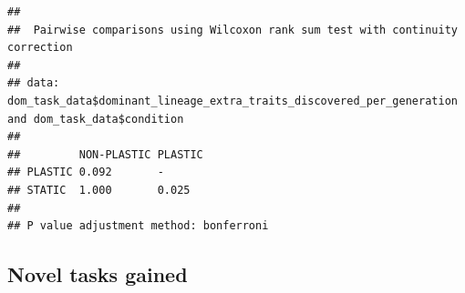 \documentclass[]{book}
\newenvironment{Shaded}{\begin{snugshade}}{\end{snugshade}}
\newcommand{\DataTypeTok}[1]{\textcolor[rgb]{0.13,0.29,0.53}{#1}}
\newcommand{\FloatTok}[1]{\textcolor[rgb]{0.00,0.00,0.81}{#1}}
\newcommand{\KeywordTok}[1]{\textcolor[rgb]{0.13,0.29,0.53}{\textbf{#1}}}
\newcommand{\NormalTok}[1]{#1}
\newcommand{\OperatorTok}[1]{\textcolor[rgb]{0.81,0.36,0.00}{\textbf{#1}}}
\newcommand{\OtherTok}[1]{\textcolor[rgb]{0.56,0.35,0.01}{#1}}
\newcommand{\StringTok}[1]{\textcolor[rgb]{0.31,0.60,0.02}{#1}}
\begin{document}
\begin{Shaded}
\end{Shaded}

\begin{verbatim}
## 
##  Pairwise comparisons using Wilcoxon rank sum test with continuity correction 
## 
## data:  dom_task_data$dominant_lineage_extra_traits_discovered_per_generation and dom_task_data$condition 
## 
##         NON-PLASTIC PLASTIC
## PLASTIC 0.092       -      
## STATIC  1.000       0.025  
## 
## P value adjustment method: bonferroni
\end{verbatim}

\hypertarget{novel-tasks-gained}{%
\subsection{Novel tasks gained}\label{novel-tasks-gained}}
\end{document}
